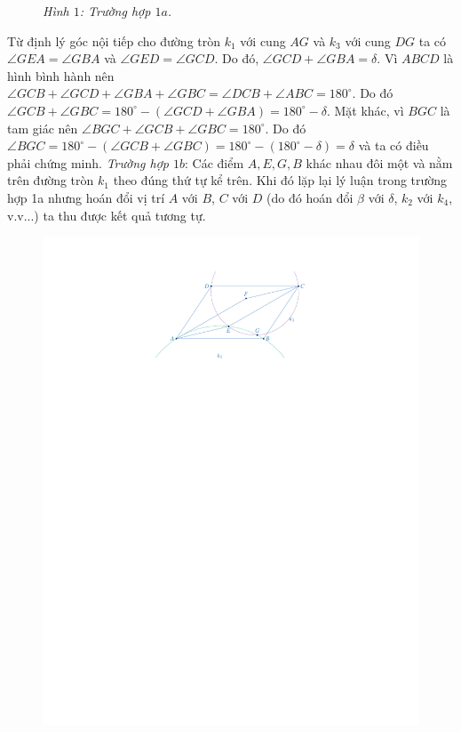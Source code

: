 \begin{multicols}{2}
\begin{figure}[H]
		\caption{\small\textit{\color{cackithi}Hình $1$: Trường hợp $1a$.}}
		\vspace*{-10pt}
	\end{figure}	
	Từ định lý góc nội tiếp cho đường tròn $k_1$ với cung $AG$ và $k_3$ với cung $DG$ ta có $\angle GEA = \angle GBA$ và  $\angle GED = \angle GCD$. Do đó, $\angle GCD + \angle GBA = \delta.$
	\vskip 0.1cm	
	Vì $ABCD$ là hình bình hành nên
	$
	\angle GCB + \angle GCD + \angle GBA + \angle GBC
	= \angle DCB + \angle ABC
	= 180^{\circ}.
	$
	Do đó $\angle GCB + \angle GBC =  180^{\circ} - (\angle GCD + \angle GBA) = 180^{\circ} - \delta$.
	\vskip 0.1cm
	Mặt khác, vì $BGC$ là tam giác nên
	$
	\angle BGC + \angle GCB + \angle GBC = 180^{\circ}.
	$
	Do đó 
	$\angle BGC  = 180^{\circ} -(\angle GCB + \angle GBC)
	= 180^{\circ} - (180^{\circ} - \delta)  
	=  \delta
	$
	và ta có điều phải chứng minh.
	\vskip 0.1cm
	\textit{Trường hợp $1b$}: Các điểm $A, E, G, B$ khác nhau đôi một và nằm trên đường tròn $k_1$ theo đúng thứ tự kể trên. Khi đó lặp lại lý luận trong trường hợp 1a nhưng hoán đổi vị trí $A$ với $B$, $C$ với $D$ (do đó hoán đổi $\beta$ với $\delta$, $k_2$ với $k_4$, v.v...) ta thu được kết quả tương tự. 
	\begin{figure}[H]
		\vspace*{-5pt}
		\centering
		\captionsetup{labelformat= empty, justification=centering}
		\includegraphics[width=1\linewidth]{h3}

\end{figure}
\end{multicols}
